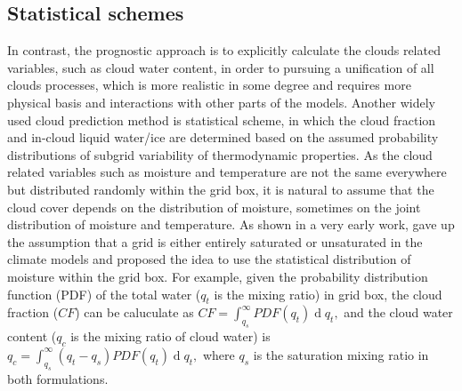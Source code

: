 \subsection{Statistical schemes}

In contrast, the prognostic approach \citep[e.g.,][]{Tiedtke1993} is to explicitly calculate the clouds related variables, such as cloud water content, in order to pursuing a unification of all clouds processes, which is more realistic in some degree and requires more physical basis and interactions with other parts of the models. Another widely used cloud prediction method is statistical scheme, in which the cloud fraction and in-cloud liquid water/ice are determined based on the assumed probability distributions of subgrid variability of thermodynamic properties. As the cloud related variables such as moisture and temperature are not the same everywhere but distributed randomly within the grid box, it is natural to assume that the cloud cover depends on the distribution of moisture, sometimes on the joint distribution of moisture and temperature. As shown in a very early work, \cite{Sommeria1977} gave up the assumption that a grid is either entirely saturated or unsaturated in the climate models and proposed the idea to use the statistical distribution of moisture within the grid box. For example, given the probability distribution function (PDF) of the total water ($q_t$ is the mixing ratio) in grid box, the cloud fraction ($CF$) can be caluculate as $CF=\int_{q_s}^{\infty}PDF(q_t)\operatorname{d}q_t,$
and the cloud water content ($q_c$ is the mixing ratio of cloud water) is
$q_c=\int_{q_s}^{\infty}(q_t-q_s)PDF(q_t)\operatorname{d}q_t,$ where $q_s$ is the saturation mixing ratio in both formulations.

